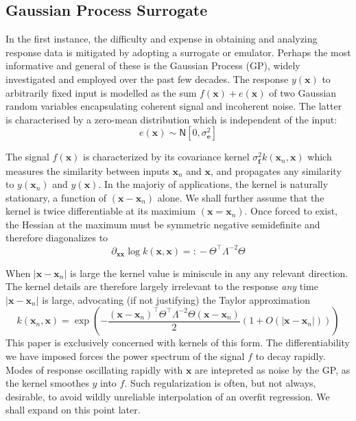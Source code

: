 \documentclass[preprint,12pt]{elsarticle}
\newcommand*{\M}[1]{\ensuremath{#1}\xspace}
\newcommand*{\vr}[1]{\M{\mathbf{#1}}}
\newcommand*{\deqr}{\M{=\mathrel{\mathop:}}}
\newcommand*{\gauss}[2]{\mathsf{N}\!\left\lbrack{} #1 , #2 \right\rbrack}
\newcommand*{\modulus}[1]{\M{\left\lvert#1\right\rvert}}
\begin{document}
        \subsection{Gaussian Process Surrogate}
            In the first instance, the difficulty and expense in obtaining and analyzing response data is mitigated by adopting a surrogate or emulator. Perhaps the most informative and general of these is the Gaussian Process (GP), widely investigated and employed over the past few decades. The response $y(\vr{x})$ to arbitrarily fixed input is modelled as the sum $f(\vr{x})+e(\vr{x})$ of two Gaussian random variables encapsulating coherent signal and incoherent noise. The latter is characterised by a zero-mean distribution which is independent of the input:
            \begin{equation*}
                e(\vr{x}) \sim \gauss{0}{\sigma^{2}_\vr{e}}
            \end{equation*}

            The signal $f(\vr{x})$ is characterized by its covariance kernel $\sigma^{2}_\vr{f} k(\vr{x}_{n},\vr{x})$ which measures the similarity between inputs $\vr{x}_{n}$ and $\vr{x}$, and propagates any similarity to $y(\vr{x}_{n})$ and $y(\vr{x})$. In the majoriy of applications, the kernel is naturally stationary, a function of $(\vr{x}-\vr{x}_{n})$ alone. We shall further assume that the kernel is twice differentiable at its maximium $(\vr{x}=\vr{x}_{n})$. Once forced to exist, the Hessian at the maximum must be symmetric negative semidefinite and therefore diagonalizes to
            \begin{equation*}
                \partial_{\vr{x}\vr{x}} \log k(\vr{x},\vr{x}) \deqr -\Theta^{\intercal}\Lambda^{-2}\Theta
            \end{equation*}

            When $\modulus{\vr{x}-\vr{x}_{n}}$ is large the kernel value is miniscule in any any relevant direction. The kernel details are therefore largely irrelevant to the response \emph{any} time $\modulus{\vr{x}-\vr{x}_{n}}$ is large, advocating (if not justifying) the Taylor approximation
            \begin{equation*}
                k(\vr{x}_{n},\vr{x}) = 
                \exp \left(-\frac
                    {(\vr{x}-\vr{x}_{n})^{\intercal} \Theta^{\intercal}\Lambda^{-2}\Theta (\vr{x}-\vr{x}_{n})}{2}
                    \left(1+O(\modulus{\vr{x}-\vr{x}_{n}})\right)
                \right)             
            \end{equation*}
            This paper is exclusively concerned with kernels of this form. The differentiability we have imposed forces the power spectrum of the signal $f$ to decay rapidly. 
            Modes of response oscillating rapidly with $\vr{x}$ are intepreted as noise by the GP, as the kernel smoothes $y$ into $f$. Such regularization is often, but not always, desirable, to avoid wildly unreliable interpolation of an overfit regression. We shall expand on this point later.
\end{document}
